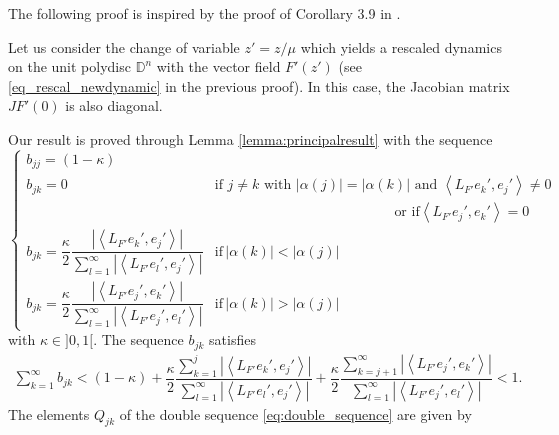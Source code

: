 \documentclass{article}
\begin{document}
The following proof is inspired by the proof of Corollary 3.9 in \cite{CMZAM2}.

Let us consider the change of variable $z'=z/\mu$ which yields a rescaled dynamics on the unit polydisc $\mathbb{D}^n $ with the vector field $F'(z')$ (see \eqref{eq_rescal_newdynamic} in the previous proof). In this case, the Jacobian matrix $JF'(0)$ is also diagonal.

Our result is proved through Lemma \ref{lemma:principalresult} with the sequence
{\small \begin{equation*}
\begin{cases}b_{jj}=(1-\kappa)\\ b_{jk}=0 & \textrm{if } j\neq k \textrm{ with }  |\alpha(j)|=|\alpha(k)|  \textrm{ and  } \left\langle  L_{F'}e_k',e_j'\right\rangle \neq 0\\
& \qquad \qquad \qquad \qquad \qquad \qquad \,\,\, \textrm{ or if} \left\langle  L_{F'}e_j',e_k'\right\rangle = 0\\
b_{jk}=\dfrac{\kappa}{2} \dfrac{\left| \left\langle L_{F'} e_k',e_j'\right\rangle \right|}{\sum_{l=1}^{\infty}\left| \left\langle  L_{F'}e_l',e_j'\right\rangle \right|} & \mbox{if}\,  |\alpha(k)|< |\alpha(j)|\\
 b_{jk}=\dfrac{\kappa}{2} \dfrac{\left| \left\langle  L_{F'} e_j', e_k'\right\rangle \right|}{\sum_{l=1}^{\infty}\left| \left\langle L_{F'}e_j',e_l' \right\rangle \right|} & \mbox{if}\,   |\alpha(k)|> |\alpha(j)| \end{cases}
\end{equation*}}
with  $\kappa\in ]0,1[$.  The sequence $b_{jk}$ satisfies 
\begin{multline*}
\sum_{k=1}^\infty b_{jk} <(1-\kappa) + \dfrac{\kappa}{2}    \dfrac{\sum_{k=1}^j \left| \left\langle L_{F'} e_k',e_j'\right\rangle \right|}{\sum_{l=1}^{\infty}\left| \left\langle  L_{F'}e_l',e_j'\right\rangle \right|}+ \dfrac{\kappa}{2}    \dfrac{\sum_{k=j+1}^\infty \left| \left\langle L_{F'} e_j',e_k'\right\rangle \right|}{\sum_{l=1}^{\infty}\left| \left\langle  L_{F'}e_j',e_l'\right\rangle \right|} < 1.
\end{multline*}
The elements $Q_{jk}$ of the double sequence \eqref{eq:double_sequence} are given by
\end{document}
